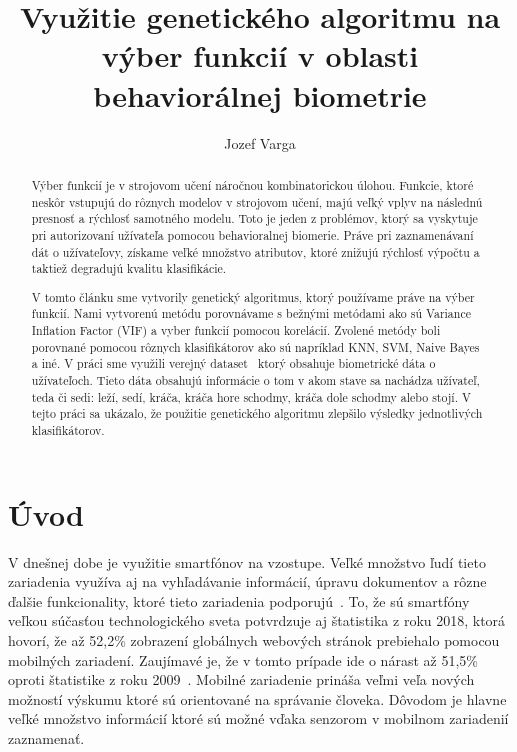 \documentclass[runningheads]{llncs}
\begin{document}
%
\title{Využitie genetického algoritmu na výber funkcií v oblasti behaviorálnej biometrie}
%
%
\author{Jozef Varga}
%
%
\maketitle              %
%
\begin{abstract}
    Výber funkcií je v strojovom učení náročnou kombinatorickou úlohou. 
    Funkcie, ktoré neskôr vstupujú do rôznych modelov v strojovom učení, majú
    veľký vplyv na následnú presnosť a rýchlosť samotného modelu. Toto je jeden z problémov,
    ktorý sa vyskytuje pri autorizovaní užívateľa pomocou behavioralnej biomerie. Práve pri
    zaznamenávaní dát o užívateľovy, získame veľké množstvo atributov, ktoré znižujú rýchlosť výpočtu
    a taktiež degradujú kvalitu klasifikácie. 
    
    V tomto článku sme vytvorily genetický algoritmus, ktorý používame práve na výber funkcií. Nami vytvorenú
    metódu porovnávame s bežnými metódami ako sú Variance Inflation Factor (VIF) a vyber funkcií pomocou korelácií. 
    Zvolené metódy boli porovnané pomocou rôznych klasifikátorov ako sú napríklad KNN, SVM, Naive Bayes a iné. 
    V práci sme využili verejný dataset~\cite{ref_dataset_anguita,ref_dataset} ktorý obsahuje biometrické dáta o 
    užívateľoch. Tieto dáta obsahujú informácie o tom v akom stave sa nachádza užívateľ, teda či sedi: leží, sedí, 
    kráča,  kráča hore schodmy, kráča dole schodmy alebo stojí.
    V tejto práci sa ukázalo, že použitie genetického algoritmu zlepšilo výsledky jednotlivých klasifikátorov.

\end{abstract}
%

\section{Úvod}

V dnešnej dobe je využitie smartfónov na vzostupe. 
Veľké množstvo ľudí tieto zariadenia využíva aj na vyhľadávanie informácií, 
úpravu dokumentov a rôzne ďalšie funkcionality, 
ktoré tieto zariadenia podporujú~\cite{ref_bomhold}. 
To, že sú smartfóny veľkou súčasťou technologického sveta potvrdzuje aj 
štatistika z roku 2018, ktorá hovorí, že až 52,2\% 
zobrazení globálnych webových stránok prebiehalo pomocou mobilných zariadení. 
Zaujímavé je, že v tomto prípade ide o nárast až 51,5\% 
oproti štatistike z roku 2009~\cite{ref_statista19}. Mobilné zariadenie
prináša veľmi veľa nových možností výskumu ktoré sú orientované na správanie človeka.
Dôvodom je hlavne veľké množstvo informácií ktoré sú možné vďaka senzorom v mobilnom 
zariadenií zaznamenať. 
\end{document}
